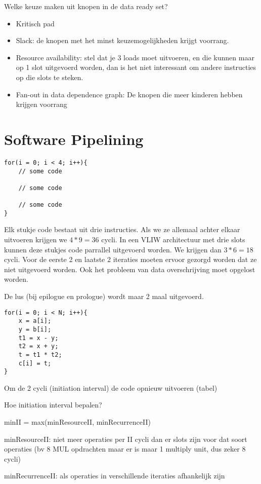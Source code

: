 Welke keuze maken uit knopen in de data ready set?
\begin{itemize}
	\item Kritisch pad
	\item Slack: de knopen met het minst keuzemogelijkheden krijgt voorrang.
	\item Resource availability: stel dat je 3 loads moet uitvoeren, en die kunnen maar op 1 slot uitgevoerd worden, dan is het niet interessant om andere instructies op die slots te steken.
	\item Fan-out in data dependence graph: De knopen die meer kinderen hebben krijgen voorrang
\end{itemize}

\section{Software Pipelining}
\begin{lstlisting}
for(i = 0; i < 4; i++){
	// some code
	
	// some code
	
	// some code
}
\end{lstlisting}

Elk stukje code bestaat uit drie instructies. Als we ze allemaal achter elkaar uitvoeren krijgen we $4 * 9 = 36$ cycli. In een VLIW architectuur met drie slots kunnen deze stukjes code parrallel uitgevoerd worden. We krijgen dan $3 * 6 = 18$ cycli. Voor de eerste 2 en laatste 2 iteraties moeten ervoor gezorgd worden dat ze niet uitgevoerd worden. Ook het probleem van data overschrijving moet opgelost worden.

De lus (bij epilogue en prologue) wordt maar 2 maal uitgevoerd.



\begin{lstlisting}
for(i = 0; i < N; i++){
	x = a[i];
	y = b[i];
	t1 = x - y;
	t2 = x + y;
	t = t1 * t2;
	c[i] = t;
}
\end{lstlisting}

Om de 2 cycli  (initiation interval) de code opnieuw uitvoeren (tabel)

Hoe initiation interval bepalen?

minII = max(minResourceII, minRecurrenceII)

minResourceII: niet meer operaties per II cycli dan er slots zijn voor dat soort operaties (bv 8 MUL opdrachten maar er is maar 1 multiply unit, dus zeker 8 cycli)

minRecurrenceII: als operaties in verschillende iteraties afhankelijk zijn


